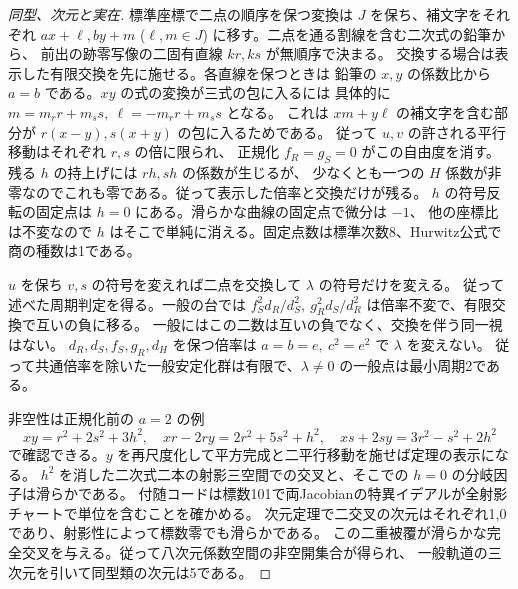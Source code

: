 \begin{proof}[同型、次元と実在]
標準座標で二点の順序を保つ変換は $J$ を保ち、補文字をそれぞれ
$ax+\ell,by+m$ ($\ell,m\in J$) に移す。二点を通る割線を含む二次式の鉛筆から、
前出の跡零写像の二固有直線 $kr,ks$ が無順序で決まる。
交換する場合は表示した有限交換を先に施せる。各直線を保つときは
鉛筆の $x,y$ の係数比から $a=b$ である。$xy$ の式の変換が三式の包に入るには
具体的に
$m=m_r r+m_s s,\ \ell=-m_r r+m_s s$ となる。
これは $xm+y\ell$ の補文字を含む部分が $r(x-y),s(x+y)$ の包に入るためである。
従って $u,v$ の許される平行移動はそれぞれ $r,s$ の倍に限られ、
正規化 $f_R=g_S=0$ がこの自由度を消す。残る $h$ の持上げには $rh,sh$ の係数が生じるが、
少なくとも一つの $H$ 係数が非零なのでこれも零である。従って表示した倍率と交換だけが残る。
$h$ の符号反転の固定点は $h=0$ にある。滑らかな曲線の固定点で微分は $-1$、
他の座標比は不変なので $h$ はそこで単純に消える。固定点数は標準次数8、Hurwitz公式で商の種数は1である。

$u$ を保ち $v,s$ の符号を変えれば二点を交換して $\lambda$ の符号だけを変える。
従って述べた周期判定を得る。一般の台では
$f_S^2d_R/d_S^2,\ g_R^2d_S/d_R^2$ は倍率不変で、有限交換で互いの負に移る。
一般にはこの二数は互いの負でなく、交換を伴う同一視はない。
$d_R,d_S,f_S,g_R,d_H$ を保つ倍率は $a=b=e,\ c^2=e^2$ で $\lambda$ を変えない。
従って共通倍率を除いた一般安定化群は有限で、$\lambda\ne0$ の一般点は最小周期2である。

非空性は正規化前の $a=2$ の例
\[
 xy=r^2+2s^2+3h^2,\quad xr-2ry=2r^2+5s^2+h^2,\quad
 xs+2sy=3r^2-s^2+2h^2
\]
で確認できる。$y$ を再尺度化して平方完成と二平行移動を施せば定理の表示になる。
$h^2$ を消した二次式二本の射影三空間での交叉と、そこでの $h=0$ の分岐因子は滑らかである。
付随コードは標数101で両Jacobianの特異イデアルが全射影チャートで単位を含むことを確かめる。
次元定理で二交叉の次元はそれぞれ1,0であり、射影性によって標数零でも滑らかである。
この二重被覆が滑らかな完全交叉を与える。従って八次元係数空間の非空開集合が得られ、
一般軌道の三次元を引いて同型類の次元は5である。
\end{proof}
